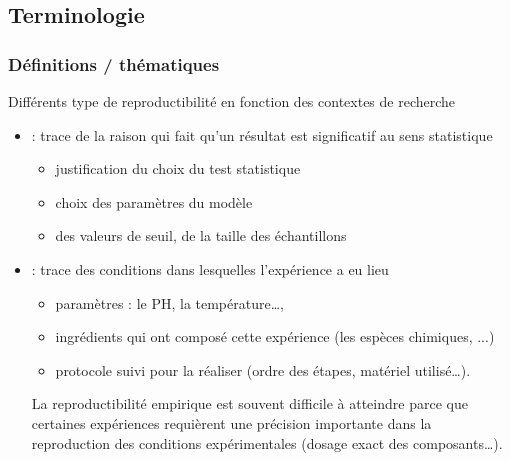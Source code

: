 \subsection{Terminologie}
\begin{frame}
\frametitle{Définitions / thématiques}
\vspace{-0.2cm}
\begin{block}{Différents type de reproductibilité en fonction des contextes de recherche}
\footnotesize
\begin{itemize}  
\item {} : trace de la raison qui fait qu'un résultat est significatif au sens statistique
    \begin{itemize}\footnotesize
    \item justification du choix du test statistique
    \item choix des paramètres du modèle
    \item des valeurs de seuil, de la taille des échantillons
    \end{itemize}  
\item {} : trace des conditions dans lesquelles l’expérience a eu lieu
        \begin{itemize}\footnotesize
        \item paramètres : le PH, la température…,
        \item ingrédients qui ont composé cette expérience (les espèces chimiques, ...)
        \item protocole suivi pour la réaliser (ordre des étapes, matériel utilisé…).
        \end{itemize}  
         La reproductibilité empirique est souvent difficile à atteindre parce que certaines expériences requièrent une précision importante dans la reproduction des conditions expérimentales (dosage exact des composants…).
 \end{itemize}         
\end{block}
\end{frame}




